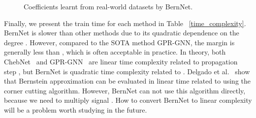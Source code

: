 \documentclass{article}
\begin{document}
\begin{figure}[t]
    \centering
   \hspace{-2mm}
   \hspace{-2mm}
   \hspace{-2mm}
   \hspace{-2mm}
    \caption{Coefficients  learnt from real-world datasets by BernNet.}
    \label{fig:coe_real_all_1}
\end{figure}
Finally, we present the train time for each method in Table ~\ref{time_complexity}. BernNet is slower than other methods due to its quadratic dependence on the degree . However, compared to the SOTA method GPR-GNN, the margin is generally less than , which is often acceptable in practice. In theory, both ChebNet~\cite{Chebnet} and GPR-GNN~\cite{chien2021GPR-GNN} are linear time complexity related to propagation step , but BernNet is quadratic time complexity related to . Delgado et al.~\cite{delgado2003linear} show that Bernstein approximation can be evaluated in linear time related to  using the corner cutting algorithm. 
However, BernNet can not use this algorithm directly, because we need to multiply signal . How to convert BernNet to linear complexity will be a problem worth studying in the future. 
\end{document}
